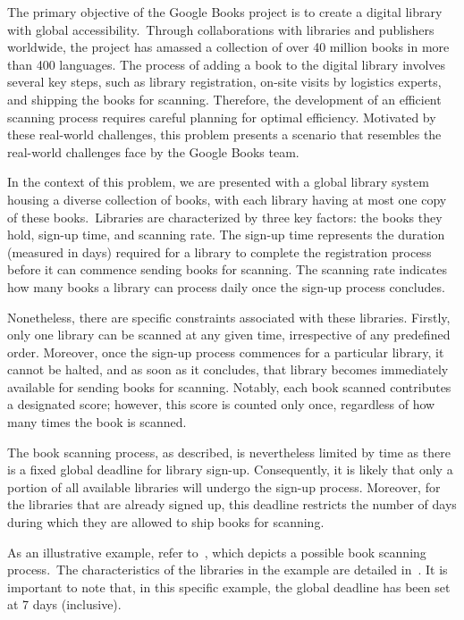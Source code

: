 The primary objective of the Google Books project is to create a digital library
with global accessibility.~Through collaborations with libraries and publishers
worldwide, the project has amassed a collection of over 40 million books in more
than 400 languages. The process of adding a book to the digital library involves
several key steps, such as library registration, on-site visits by logistics
experts, and shipping the books for scanning. Therefore, the development of an
efficient scanning process requires careful planning for optimal efficiency.
Motivated by these real-world challenges, this problem presents a scenario that
resembles the real-world challenges face by the Google Books team.

In the context of this problem, we are presented with a global library system
housing a diverse collection of books, with each library having at most one copy
of these books.~Libraries are characterized by three key factors: the books they
hold, sign-up time, and scanning rate. The sign-up time represents the duration
(measured in days) required for a library to complete the registration process
before it can commence sending books for scanning. The scanning rate indicates
how many books a library can process daily once the sign-up process concludes.

Nonetheless, there are specific constraints associated with these libraries.
Firstly, only one library can be scanned at any given time, irrespective of any
predefined order. Moreover, once the sign-up process commences for a particular
library, it cannot be halted, and as soon as it concludes, that library becomes
immediately available for sending books for scanning. Notably, each book scanned
contributes a designated score; however, this score is counted only once,
regardless of how many times the book is scanned.

The book scanning process, as described, is nevertheless limited by time as
there is a fixed global deadline for library sign-up. Consequently, it is likely
that only a portion of all available libraries will undergo the sign-up process.
Moreover, for the libraries that are already signed up, this deadline restricts
the number of days during which they are allowed to ship books for scanning.

As an illustrative example, refer to~, which depicts a
possible book scanning process.~The characteristics of the libraries in the
example are detailed in~. It is important to
note that, in this specific example, the global deadline has been set at 7 days
(inclusive).


